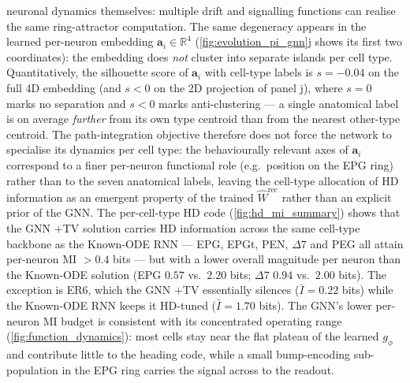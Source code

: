 \documentclass[11pt]{article}
\begin{document}
neuronal dynamics themselves: multiple drift and signalling
functions can realise the same ring-attractor computation.
The same degeneracy appears in the learned per-neuron embedding
$\mathbf{a}_i \in \mathbb{R}^4$ (\cref{fig:evolution_pi_gnn}j
shows its first two coordinates): the embedding does \emph{not}
cluster into separate islands per cell type. Quantitatively, the
silhouette score of $\mathbf{a}_i$ with cell-type labels is
$s = -0.04$ on the full 4D embedding (and $s < 0$ on the 2D
projection of panel j), where $s = 0$ marks no separation and
$s < 0$ marks anti-clustering --- a single anatomical label is on
average \emph{further} from its own type centroid than from the
nearest other-type centroid. The path-integration objective
therefore does not force the network to specialise its dynamics
per cell type: the behaviourally relevant axes of $\mathbf{a}_i$
correspond to a finer per-neuron functional role (e.g.\ position
on the EPG ring) rather than to the seven anatomical labels,
leaving the cell-type allocation of HD information as an emergent
property of the trained $\hat W^{\mathrm{rec}}$ rather than an
explicit prior of the GNN.
The per-cell-type HD code (\cref{fig:hd_mi_summary}) shows that
the GNN $+$TV solution carries HD information across the same
cell-type backbone as the Known-ODE RNN --- EPG, EPGt, PEN, $\Delta
7$ and PEG all attain per-neuron MI $> 0.4$ bits --- but with a
lower overall magnitude per neuron than the Known-ODE solution
(EPG $0.57$ vs.\ $2.20$ bits; $\Delta 7$ $0.94$ vs.\ $2.00$ bits).
The exception is ER6, which the GNN $+$TV essentially silences
($\bar I = 0.22$ bits) while the Known-ODE RNN keeps it
HD-tuned ($\bar I = 1.70$ bits). The GNN's lower per-neuron MI
budget is consistent with its concentrated operating range
(\cref{fig:function_dynamics}): most cells stay near the flat
plateau of the learned $g_\phi$ and contribute little to the
heading code, while a small bump-encoding sub-population in the EPG
ring carries the signal across to the readout.
\end{document}
